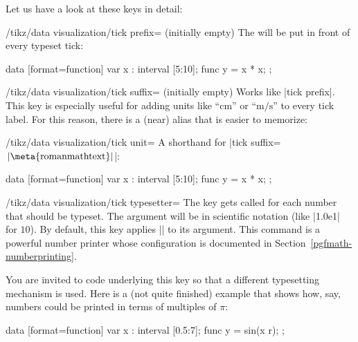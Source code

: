 Let us have a look at these keys in detail:

\begin{key}{/tikz/data visualization/tick prefix= (initially \normalfont empty)}
    The  will be put in front of every typeset tick:
\begin{codeexample}[preamble={\usetikzlibrary{datavisualization.formats.functions}}]
\tikz \datavisualization
  [scientific axes, all axes={ticks=few, length=2.5cm},
   x axis={ticks={tick prefix=$\langle$, tick suffix=$]$}},
   visualize as line]
  data [format=function] {
    var x : interval [5:10];
    func y = \value x * \value x;
  };
\end{codeexample}
\end{key}

\begin{key}{/tikz/data visualization/tick suffix= (initially \normalfont empty)}
    Works like |tick prefix|. This key is especially useful for adding units
    like ``cm'' or ``$\mathrm m/\mathrm s$'' to every tick label. For this
    reason, there is a (near) alias that is easier to memorize:
    \begin{key}{/tikz/data visualization/tick unit=}
        A shorthand for |tick suffix={$\,\rm|\meta{roman math text}|$}|:
\begin{codeexample}[preamble={\usetikzlibrary{datavisualization.formats.functions}}]
\tikz \datavisualization
  [scientific axes, all axes={length=3cm},
   x axis={ticks={tick unit=s}},
   y axis={ticks={tick unit=m/s^2}},
   visualize as line]
  data [format=function] {
    var x : interval [5:10];
    func y = \value x * \value x;
  };
\end{codeexample}
    \end{key}
\end{key}

\begin{key}{/tikz/data visualization/tick typesetter=}
    The key gets called for each number that should be typeset. The argument
     will be in scientific notation (like |1.0e1| for $10$). By
    default, this key applies |\pgfmathprintnumber| to its argument. This
    command is a powerful number printer whose configuration is documented in
    Section~\ref{pgfmath-numberprinting}.

    You are invited to code underlying this key so that a different typesetting
    mechanism is used. Here is a (not quite finished) example that shows how,
    say, numbers could be printed in terms of multiples of $\pi$:
\begin{codeexample}[preamble={\usetikzlibrary{datavisualization.formats.functions}}]
\def\mytypesetter#1{%
  \pgfmathparse{#1/pi}%
  \pgfmathprintnumber{\pgfmathresult}$\pi$%
}
\tikz \datavisualization
  [school book axes, all axes={unit length=1.25cm},
   x axis={ticks={step=(0.5*pi), tick typesetter/.code=\mytypesetter{##1}}},
   y axis={include value={-1,1}},
   visualize as smooth line]
  data [format=function] {
    var x : interval [0.5:7];
    func y = sin(\value x r);
  };
\end{codeexample}
\end{key}


